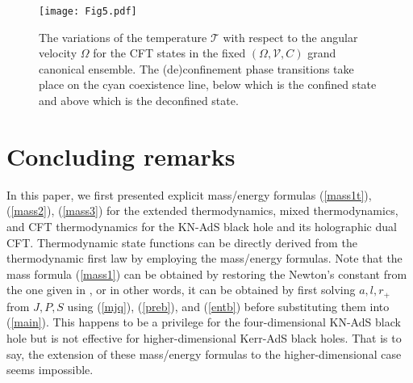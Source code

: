 \documentclass[a4paper,11pt]{article}
\newcommand{\eq}[1]{(\ref{#1})}
\def\T{\mathcal{T}} \def\O{\mathcal{O}} \def\S{\mathcal{S}}\def\J{\mathcal{J}}\def\V{\mathcal{V}}\def\Q{\mathcal{Q}}\def\F{\mathcal{F}}
\begin{document}
 
\begin{figure}[tbp!]
\begin{center}
\texttt{[image: Fig5.pdf]}
\end{center}
\vspace{-5mm}
 \caption {The variations of the temperature $\T$ with respect to the angular velocity $\Omega$ for the CFT states in the fixed $(\Omega, \mathcal{V}, C)$ grand canonical ensemble. The (de)confinement phase transitions take place on the cyan coexistence line, below which is the confined state and above which is the deconfined state.}
 \label{fig6}
\end{figure}






\section{Concluding remarks}

In this paper, we first presented explicit  mass/energy formulas \eq{mass1t}, \eq{mass2}, \eq{mass3} for the extended thermodynamics, mixed thermodynamics, and CFT thermodynamics for the KN-AdS black hole and its holographic dual CFT. Thermodynamic state functions can be directly derived from the thermodynamic first law by employing the mass/energy formulas. Note that the mass formula \eq{mass1} can be obtained by restoring the Newton's constant from the one given in \cite{Caldarelli:1999xj}, or in other words, it can be obtained by first solving $a, l, r_+$ from $J, P, S$ using \eq{mjq}, \eq{preb}, and \eq{entb} before substituting them into \eq{main}. This happens to be a privilege for the four-dimensional KN-AdS black hole but is not effective for higher-dimensional Kerr-AdS black holes. That is to say, the extension of these mass/energy formulas to the higher-dimensional case seems impossible.
\end{document}

